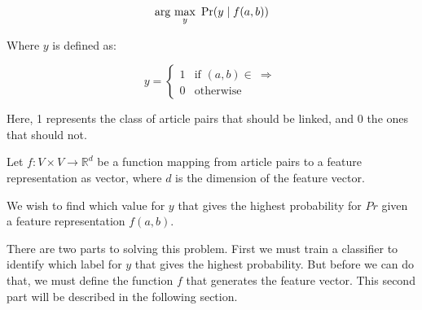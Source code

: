 \begin{equation}
\label{objective}
\arg\ \!\max_y\ \Pr(y \mid f(a,b)) 
\end{equation}

Where $y$ is defined as:

\[
    y=
\begin{cases}
    1 & \text{if } (a,b) \in \  \Rightarrow\\
    0 & \text{otherwise}
\end{cases}
\]

Here, 1 represents the class of article pairs that should be linked, and 0 the ones that should not.

Let $f: V\times V \to \mathbb{R}^d$ be a function mapping from article pairs to a feature representation as vector, where $d$ is the dimension of the feature vector.

We wish to find which value for $y$ that gives the highest probability for $Pr$ given a feature representation $f(a,b)$.


There are two parts to solving this problem. First we must train a classifier to identify which label for $y$ that gives the highest probability. But before we can do that, we must define the function $f$ that generates the feature vector. This second part will be described in the following section.

%
%
%


